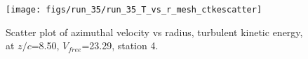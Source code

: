 \begin{figure}[H]
\centering
\texttt{[image: figs/run\_35/run\_35\_T\_vs\_r\_mesh\_ctkescatter]}
\caption{Scatter plot of azimuthal velocity vs radius, turbulent kinetic energy, at $z/c$=8.50, $V_{free}$=23.29, station 4.}
\label{fig:run_35_T_vs_r_mesh_ctkescatter}
\end{figure}


